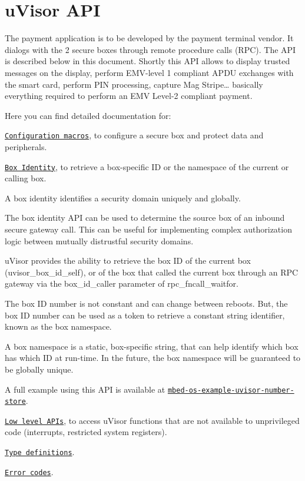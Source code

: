 \hypertarget{group__hypervisor}{}\section{u\+Visor A\+PI}
\label{group__hypervisor}
The payment application is to be developed by the payment terminal vendor. It dialogs with the 2 secure boxes through remote procedure calls (R\+PC). The A\+PI is described below in this document. Shortly this A\+PI allows to display trusted messages on the display, perform E\+M\+V-\/level 1 compliant A\+P\+DU exchanges with the smart card, perform P\+IN processing, capture Mag Stripe… basically everything required to perform an E\+MV Level-\/2 compliant payment.

Here you can find detailed documentation for\+:


\begin{DoxyEnumerate}
\item \href{#configuration-macros}{\tt Configuration macros}, to configure a secure box and protect data and peripherals.
\item \href{#box-identity}{\tt Box Identity}, to retrieve a box-\/specific ID or the namespace of the current or calling box.
\begin{DoxyItemize}
\item A box identity identifies a security domain uniquely and globally.
\item The box identity A\+PI can be used to determine the source box of an inbound secure gateway call. This can be useful for implementing complex authorization logic between mutually distrustful security domains.
\item u\+Visor provides the ability to retrieve the box ID of the current box ({\ttfamily uvisor\+\_\+box\+\_\+id\+\_\+self}), or of the box that called the current box through an R\+PC gateway via the {\ttfamily box\+\_\+id\+\_\+caller} parameter of {\ttfamily rpc\+\_\+fncall\+\_\+waitfor}.
\item The box ID number is not constant and can change between reboots. But, the box ID number can be used as a token to retrieve a constant string identifier, known as the box namespace.
\item A box namespace is a static, box-\/specific string, that can help identify which box has which ID at run-\/time. In the future, the box namespace will be guaranteed to be globally unique.
\item A full example using this A\+PI is available at \href{https://github.com/ARMmbed/mbed-os-example-uvisor-number-store}{\tt mbed-\/os-\/example-\/uvisor-\/number-\/store}.
\end{DoxyItemize}
\item \href{#low-level-apis}{\tt Low level A\+P\+Is}, to access u\+Visor functions that are not available to unprivileged code (interrupts, restricted system registers).
\item \href{#type-definitions}{\tt Type definitions}.
\item \href{#error-codes}{\tt Error codes}.
\end{DoxyEnumerate}

